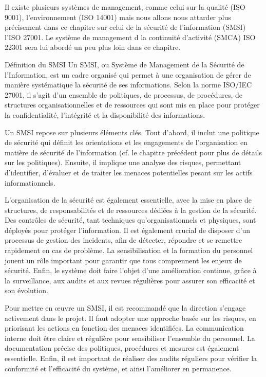 Il existe plusieurs systèmes de management, comme celui sur la qualité (ISO 9001), l'environnement (ISO 14001) mais nous allons nous attarder plus précisement dans ce chapitre sur celui de la sécurité de l'information (SMSI) l'ISO 27001. Le système de management d la continuité d'activité (SMCA) ISO 22301 sera lui abordé un peu plus loin dans ce chapitre.

Définition du SMSI
Un SMSI, ou Système de Management de la Sécurité de l'Information, est un cadre organisé qui permet à une organisation de gérer de manière systématique la sécurité de ses informations. Selon la norme ISO/IEC 27001, il s'agit d'un ensemble de politiques, de processus, de procédures, de structures organisationnelles et de ressources qui sont mis en place pour protéger la confidentialité, l'intégrité et la disponibilité des informations.

Un SMSI repose sur plusieurs éléments clés. Tout d’abord, il inclut une politique de sécurité qui définit les orientations et les engagements de l’organisation en matière de sécurité de l’information (cf. le chapitre précédent pour plus de détails sur les politiques). Ensuite, il implique une analyse des risques, permettant d’identifier, d’évaluer et de traiter les menaces potentielles pesant sur les actifs informationnels.

L’organisation de la sécurité est également essentielle, avec la mise en place de structures, de responsabilités et de ressources dédiées à la gestion de la sécurité. Des contrôles de sécurité, tant techniques qu’organisationnels et physiques, sont déployés pour protéger l’information. Il est également crucial de disposer d’un processus de gestion des incidents, afin de détecter, répondre et se remettre rapidement en cas de problème. La sensibilisation et la formation du personnel jouent un rôle important pour garantir que tous comprennent les enjeux de sécurité. Enfin, le système doit faire l’objet d’une amélioration continue, grâce à la surveillance, aux audits et aux revues régulières pour assurer son efficacité et son évolution.

Pour mettre en œuvre un SMSI, il est recommandé que la direction s’engage activement dans le projet. Il faut adopter une approche basée sur les risques, en priorisant les actions en fonction des menaces identifiées. La communication interne doit être claire et régulière pour sensibiliser l’ensemble du personnel. La documentation précise des politiques, procédures et mesures est également essentielle. Enfin, il est important de réaliser des audits réguliers pour vérifier la conformité et l’efficacité du système, et ainsi l’améliorer en permanence.

